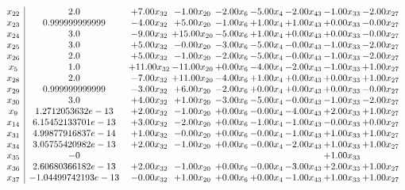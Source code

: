\documentclass[8pt]{article}
\begin{document}
\[\begin{array}{c| c c@{\hskip 2pt} c@{\hskip 2pt} c@{\hskip 2pt} c@{\hskip 2pt} c@{\hskip 2pt} c@{\hskip 2pt} c@{\hskip 2pt} }
 x_{22}   &  2.0 & +  7.00 x_{32} & -1.00 x_{20} & -2.00 x_{6} & -5.00 x_{4} & -2.00 x_{43} & -1.00 x_{33} & -2.00 x_{27}\\
 x_{23}   &  0.999999999999 & -4.00 x_{32} & +  5.00 x_{20} & -1.00 x_{6} & +  1.00 x_{4} & +  1.00 x_{43} & +  0.00 x_{33} & -0.00 x_{27}\\
 x_{24}   &  3.0 & -9.00 x_{32} & + 15.00 x_{20} & -5.00 x_{6} & +  1.00 x_{4} & +  0.00 x_{43} & +  0.00 x_{33} & -0.00 x_{27}\\
 x_{25}   &  3.0 & +  5.00 x_{32} & -0.00 x_{20} & -3.00 x_{6} & -5.00 x_{4} & -0.00 x_{43} & -1.00 x_{33} & -2.00 x_{27}\\
 x_{26}   &  2.0 & +  5.00 x_{32} & -1.00 x_{20} & -2.00 x_{6} & -5.00 x_{4} & -0.00 x_{43} & -1.00 x_{33} & -2.00 x_{27}\\
 x_{5}   &  1.0 & + 11.00 x_{32} & -11.00 x_{20} & +  0.00 x_{6} & -4.00 x_{4} & -2.00 x_{43} & -1.00 x_{33} & +  1.00 x_{27}\\
 x_{28}   &  2.0 & -7.00 x_{32} & + 11.00 x_{20} & -4.00 x_{6} & +  1.00 x_{4} & +  0.00 x_{43} & +  0.00 x_{33} & +  1.00 x_{27}\\
 x_{29}   &  0.999999999999 & -3.00 x_{32} & +  6.00 x_{20} & -2.00 x_{6} & +  0.00 x_{4} & +  0.00 x_{43} & +  0.00 x_{33} & -0.00 x_{27}\\
 x_{30}   &  3.0 & +  4.00 x_{32} & +  1.00 x_{20} & -3.00 x_{6} & -5.00 x_{4} & -0.00 x_{43} & -1.00 x_{33} & -2.00 x_{27}\\
 x_{9}   &  1.2712053632e-13 & +  2.00 x_{32} & -1.00 x_{20} & +  0.00 x_{6} & -0.00 x_{4} & -4.00 x_{43} & +  2.00 x_{33} & +  1.00 x_{27}\\
 x_{14}   &  6.15452133701e-13 & +  3.00 x_{32} & -2.00 x_{20} & +  0.00 x_{6} & -1.00 x_{4} & -1.00 x_{43} & -0.00 x_{33} & +  0.00 x_{27}\\
 x_{31}   &  4.99877916837e-14 & +  1.00 x_{32} & -0.00 x_{20} & +  0.00 x_{6} & -0.00 x_{4} & -1.00 x_{43} & +  1.00 x_{33} & +  1.00 x_{27}\\
 x_{34}   &  3.05755420982e-13 & +  2.00 x_{32} & -1.00 x_{20} & +  0.00 x_{6} & -0.00 x_{4} & -2.00 x_{43} & +  1.00 x_{33} & +  1.00 x_{27}\\
 x_{35}   &  -0  &    &    &    &    &   & +  1.00 x_{33} &   \\
 x_{36}   &  2.60680366182e-13 & +  2.00 x_{32} & -1.00 x_{20} & +  0.00 x_{6} & -0.00 x_{4} & -3.00 x_{43} & +  2.00 x_{33} & +  1.00 x_{27}\\
 x_{37}   &  -1.04499742193e-13 & -0.00 x_{32} & +  1.00 x_{20} & +  0.00 x_{6} & +  0.00 x_{4} & -1.00 x_{43} & +  1.00 x_{33} & +  1.00 x_{27}\\

\end{array}\]
\end{document}
